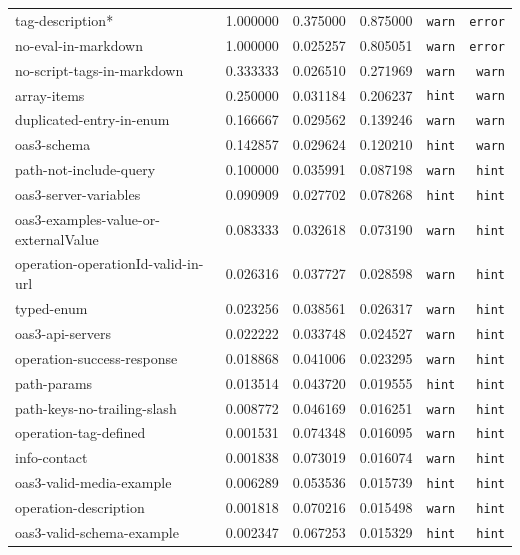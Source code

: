 {\begin{longtable}{lrrrrr}
tag-description* &  1.000000 &  0.375000 & 0.875000 & \texttt{warn} & \texttt{error} \\
no-eval-in-markdown &  1.000000 &  0.025257 & 0.805051 & \texttt{warn} & \texttt{error} \\ \hline
no-script-tags-in-markdown & 0.333333 &  0.026510 & 0.271969 & \texttt{warn} & \texttt{warn} \\
array-items &  0.250000 &  0.031184 & 0.206237 & \texttt{hint} & \texttt{warn} \\
duplicated-entry-in-enum & 0.166667 &  0.029562 & 0.139246 & \texttt{warn} & \texttt{warn} \\
oas3-schema &  0.142857 &  0.029624 & 0.120210 & \texttt{hint} & \texttt{warn} \\ \hline
path-not-include-query & 0.100000 &  0.035991 & 0.087198 & \texttt{warn} & \texttt{hint} \\
oas3-server-variables &  0.090909 &  0.027702 & 0.078268 & \texttt{hint} & \texttt{hint} \\
oas3-examples-value-or-externalValue & 0.083333 &  0.032618 & 0.073190 & \texttt{warn} & \texttt{hint} \\
operation-operationId-valid-in-url & 0.026316 &  0.037727 & 0.028598 & \texttt{warn} & \texttt{hint} \\
typed-enum & 0.023256 &  0.038561 & 0.026317 & \texttt{warn} & \texttt{hint} \\
oas3-api-servers & 0.022222 &  0.033748 & 0.024527 & \texttt{warn} & \texttt{hint} \\
operation-success-response & 0.018868 &  0.041006 & 0.023295 & \texttt{warn} & \texttt{hint} \\
path-params &  0.013514 &  0.043720 & 0.019555 & \texttt{hint} & \texttt{hint} \\
path-keys-no-trailing-slash &  0.008772 &  0.046169 & 0.016251 & \texttt{warn} & \texttt{hint} \\
operation-tag-defined &  0.001531 &  0.074348 & 0.016095 & \texttt{warn} & \texttt{hint} \\
info-contact & 0.001838 &  0.073019 & 0.016074 & \texttt{warn} & \texttt{hint} \\
oas3-valid-media-example & 0.006289 &  0.053536 & 0.015739 & \texttt{hint} & \texttt{hint} \\
operation-description &  0.001818 &  0.070216 & 0.015498 & \texttt{warn} & \texttt{hint} \\
oas3-valid-schema-example &  0.002347 &  0.067253 & 0.015329 & \texttt{hint} & \texttt{hint} \\

\end{longtable}}
